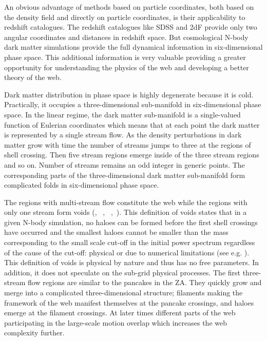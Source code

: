 An obvious advantage of methods based on particle coordinates, both based on the density field and directly on particle coordinates, is their applicability to redshift catalogues. 
The redshift catalogues like SDSS and 2dF provide only two angular coordinates and distances in redshift space. 
But cosmological N-body dark matter simulations provide the full dynamical information in six-dimensional
phase space. This additional information is very valuable providing a greater opportunity for understanding the 
physics of the web and developing a better theory of the web.

Dark matter distribution in phase space is highly degenerate because it is cold. 
Practically, it occupies a three-dimensional sub-manifold in six-dimensional phase space.
 In the linear regime, the dark matter sub-manifold is a single-valued function of Eulerian coordinates 
 which means that at each point the dark matter is represented by a single stream flow. As the density perturbations in dark matter grow with time the number of streams jumps to three at the regions of
shell crossing. Then five stream regions emerge inside of the three stream regions and so on.
Number of streams remains an odd integer in generic points.   The corresponding parts of the three-dimensional dark matter sub-manifold 
form complicated folds in six-dimensional  phase space.   

The regions with multi-stream flow constitute the web while the regions with only one stream form
voids (\citealt{Shandarin2011}, ~\citealt{Shandarin2012}, ~\citealt{Abel2012},~\citealt{Falck2012}).
This definition of voids states that in a given N-body simulation, no haloes can be formed before the first
shell crossings have occurred and the smallest haloes cannot be smaller than the mass corresponding 
to the small scale cut-off in the initial power spectrum regardless of the cause of the cut-off:  physical or due to numerical
limitations (see e.g. \citealt{Angulo2013}).  This definition of voids is physical by nature and thus has no  free parameters. In addition, it does not speculate on the sub-grid physical processes.
The first three-stream flow regions are similar to the pancakes in the ZA.
They quickly grow and merge into a complicated three-dimensional structure; filaments making the framework of the web manifest 
themselves at the pancake crossings,  and haloes emerge at the filament crossings. At later times  different parts of the web participating
in the large-scale motion overlap  which increases the web complexity further.

